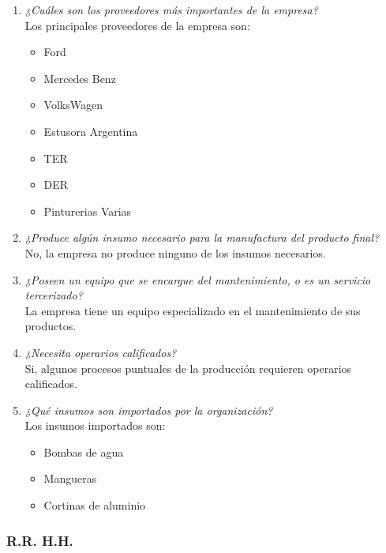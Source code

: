 \documentclass[a4paper,10pt]{article}
\begin{document}
\begin{enumerate}[resume]
				\item \textit{¿Cuáles son los proveedores más importantes de la empresa?}\\	
				Los principales proveedores de la empresa son:
				\begin{itemize}
					\item Ford
					\item Mercedes Benz
					\item VolksWagen
					\item Estusora Argentina
					\item TER
					\item DER
					\item Pinturerias Varias
				\end{itemize}
				
				\item \textit{¿Produce algún insumo necesario para la manufactura del producto final?}\\	
				No, la empresa no produce ninguno de los insumos necesarios.
				
				\item \textit{¿Poseen un equipo que se encargue del mantenimiento, o es un servicio tercerizado?}\\	
				La empresa tiene un equipo especializado en el mantenimiento de sus productos.
				
				\item \textit{¿Necesita operarios calificados?}\\	
				Si, algunos procesos puntuales de la producción requieren operarios calificados.
				
				\item \textit{¿Qué insumos son importados por la organización?}\\	
				Los insumos importados son:
				\begin{itemize}
					\item Bombas de agua
					\item Mangueras
					\item Cortinas de aluminio
				\end{itemize}
			
			\end{enumerate}			
			
	\subsubsection{R.R. H.H.}
		
\end{document}
